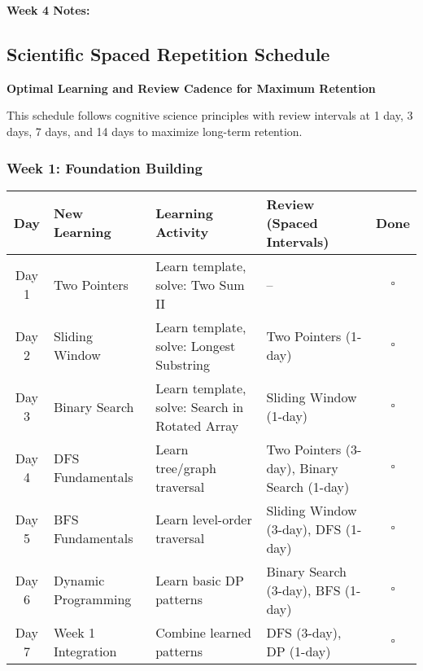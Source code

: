 \documentclass[10pt,a4paper]{article}
\begin{document}
\textbf{Week 4 Notes:}\\

\newpage

\subsection{Scientific Spaced Repetition Schedule}

\textbf{Optimal Learning and Review Cadence for Maximum Retention}

This schedule follows cognitive science principles with review intervals at 1 day, 3 days, 7 days, and 14 days to maximize long-term retention.

\subsubsection{Week 1: Foundation Building}

\begin{table}[h]
\centering
\small
\begin{tabular}{|c|p{3cm}|p{4cm}|p{4cm}|c|}
\hline
\textbf{Day} & \textbf{New Learning} & \textbf{Learning Activity} & \textbf{Review (Spaced Intervals)} & \textbf{Done} \\
\hline
Day 1 & Two Pointers & Learn template, solve: Two Sum II & -- & $\square$ \\
\hline
Day 2 & Sliding Window & Learn template, solve: Longest Substring & Two Pointers (1-day) & $\square$ \\
\hline
Day 3 & Binary Search & Learn template, solve: Search in Rotated Array & Sliding Window (1-day) & $\square$ \\
\hline
Day 4 & DFS Fundamentals & Learn tree/graph traversal & Two Pointers (3-day), Binary Search (1-day) & $\square$ \\
\hline
Day 5 & BFS Fundamentals & Learn level-order traversal & Sliding Window (3-day), DFS (1-day) & $\square$ \\
\hline
Day 6 & Dynamic Programming & Learn basic DP patterns & Binary Search (3-day), BFS (1-day) & $\square$ \\
\hline
Day 7 & Week 1 Integration & Combine learned patterns & DFS (3-day), DP (1-day) & $\square$ \\
\hline
\end{tabular}
\end{table}
\end{document}
